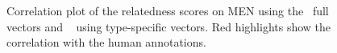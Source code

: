 \begin{figure}
\centering
{}

\caption{Correlation plot of the relatedness scores on MEN using the~ full vectors and ~ using type-specific vectors. Red highlights show the correlation with the human annotations.}
\label{fig:men_cor}
\end{figure}

